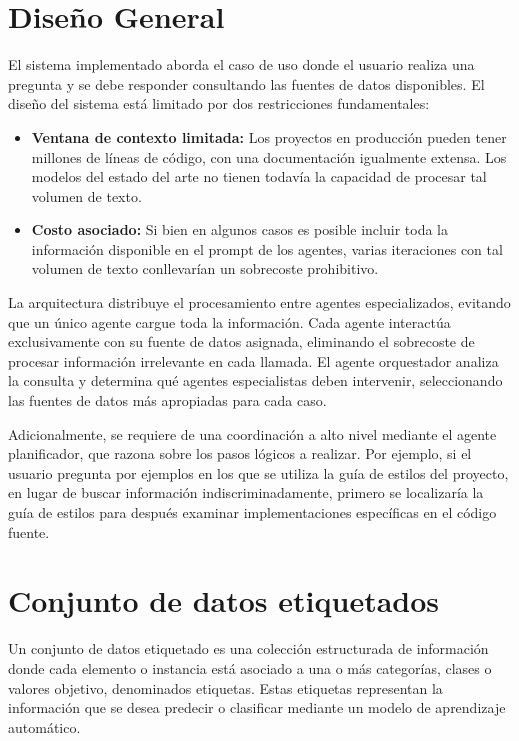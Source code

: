 \section{Diseño General}
El sistema implementado aborda el caso de uso donde el usuario realiza una pregunta y se debe responder consultando las fuentes de datos disponibles. El diseño del sistema está limitado por dos restricciones fundamentales: 
\begin{itemize}
  \item\textbf{Ventana de contexto limitada: }Los proyectos en producción pueden tener millones de líneas de código, con una documentación igualmente extensa. Los modelos del estado del arte no tienen todavía la capacidad de procesar tal volumen de texto. 
  \item\textbf{Costo asociado: }Si bien en algunos casos es posible incluir toda la información disponible en el prompt de los agentes, varias iteraciones con tal volumen de texto conllevarían un sobrecoste prohibitivo. 
\end{itemize}
La arquitectura distribuye el procesamiento entre agentes especializados, evitando que un único agente cargue toda la información. Cada agente interactúa exclusivamente con su fuente de datos asignada, eliminando el sobrecoste de procesar información irrelevante en cada llamada. El agente orquestador analiza la consulta y determina qué agentes especialistas deben intervenir, seleccionando las fuentes de datos más apropiadas para cada caso.

Adicionalmente, se requiere de una coordinación a alto nivel mediante el agente planificador, que razona sobre los pasos lógicos a realizar. Por ejemplo, si el usuario pregunta por ejemplos en los que se utiliza la guía de estilos del proyecto, en lugar de buscar información indiscriminadamente, primero se localizaría la guía de estilos para después examinar implementaciones específicas en el código fuente. 

\section{Conjunto de datos etiquetados}
\label{anexo:datos_et}
Un conjunto de datos etiquetado es una colección estructurada de información donde cada elemento o instancia está asociado a una o más categorías, clases o valores objetivo, denominados etiquetas. Estas etiquetas representan la información que se desea predecir o clasificar mediante un modelo de aprendizaje automático.


